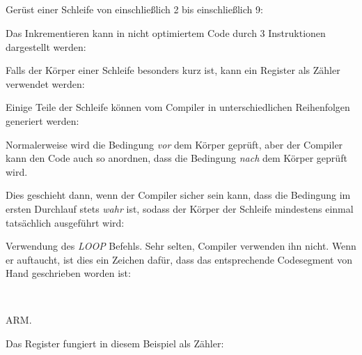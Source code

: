 \subsection{\Conclusion{}}

Gerüst einer Schleife von einschließlich 2 bis einschließlich 9:



Das Inkrementieren kann in nicht optimiertem Code durch 3 Instruktionen
dargestellt werden:



Falls der Körper einer Schleife besonders kurz ist, kann ein Register als Zähler
verwendet werden:



Einige Teile der Schleife können vom Compiler in unterschiedlichen Reihenfolgen
generiert werden:



Normalerweise wird die Bedingung \emph{vor} dem Körper geprüft, aber der Compiler
kann den Code auch so anordnen, dass die Bedingung \emph{nach} dem Körper geprüft
wird.

Dies geschieht dann, wenn der Compiler sicher sein kann, dass die Bedingung im
ersten Durchlauf stets \emph{wahr} ist, sodass der Körper der Schleife mindestens
einmal tatsächlich ausgeführt wird:




Verwendung des \emph{LOOP} Befehls. Sehr selten, Compiler verwenden ihn nicht.
Wenn er auftaucht, ist dies ein Zeichen dafür, dass das entsprechende
Codesegment von Hand geschrieben worden ist:

　


ARM. 

Das  Register fungiert in diesem Beispiel als Zähler:

　


